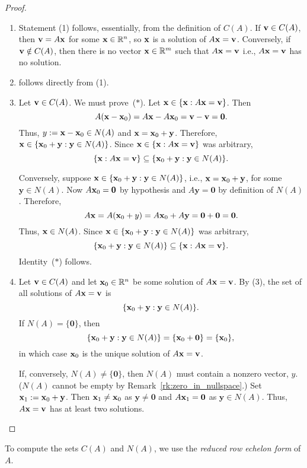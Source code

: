 \documentclass[12pt]{amsart}
\newcommand{\RR}{\mathbb{R}} \DeclareMathOperator{\rref}{rref}
\theoremstyle{definition} \newtheorem{definition}[theorem]{Definition}
\newcommand{\by}{\mathbf{y}} \newcommand{\bz}{\mathbf{z}}
\newcommand{\bzero}{\mathbf{0}}
\newcommand{\setstuff}{\setlength{\parskip}{0.5em}\setlength{\parindent}{0em}\setlength{\itemsep}{0.5em}}
\begin{document}
\begin{proof}\hfill
  \begin{enumerate}\setstuff
  \item Statement (1) follows, essentially, from the definition of $C(A)$.
    If $\mathbf{v}\in C(A)$, then $\mathbf{v}=A\mathbf{x}$ for some $\bx\in\RR^n$, so $\mathbf{x}$ is a solution of $A\mathbf{x}=\mathbf{v}$.
    Conversely, if $\mathbf{v}\notin C(A)$, then there is no vector $\bx\in\RR^m$ such that $A\mathbf{x}=\mathbf{v}$ i.e., $A\mathbf{x}=\mathbf{v}$ has no solution.

  \item follows directly from (1).

  \item Let $\mathbf{v}\in C(A)$. We must prove~($*$). Let $\mathbf{x}\in \{\mathbf{x} : A\mathbf{x}=\mathbf{v}\}$. Then
    \[
      A(\bx-\bx_0) = A\bx - A\bx_0 = \bv - \bv = \bzero.
    \]
    Thus, $y := \mathbf{x}-\mathbf{x}_0\in N(A)$ and $\bx = \bx_0 + \by$.
    Therefore, $\bx\in \{\bx_0 + \by : \by\in N(A)\}$.
    Since $\mathbf{x}\in \{\mathbf{x} : A\mathbf{x}=\mathbf{v}\}$ was arbitrary,
    \[
      \{\bx : A\bx=\bv\}\subseteq\{\bx_0 + \by : \by\in N(A)\}.
    \]

    Conversely, suppose $\bx\in \{\bx_0 + \by : \by\in N(A)\}$, i.e., $\bx = \bx_0 + \by$, for some $\by\in N(A)$.
    Now $A\bx_0=\bzero$ by hypothesis and $A\by=\bzero$ by definition of $N(A)$.
    Therefore,
    \[
      A\bx = A(\bx_0 + y) = A\bx_0 + A\by = \bzero + \bzero = \bzero.
    \]
    Thus, $\mathbf{x}\in N(A)$.
    Since $\bx\in \{\bx_0 + \by : \by\in N(A)\}$ was arbitrary,
    \[
      \{\bx_0 + \by : \by\in N(A)\}\subseteq \{\bx : A\bx=\bv\}.
    \]
    Identity~($*$) follows.

    \item Let $\mathbf{v}\in C(A)$ and let $\bx_0\in\RR^n$ be some solution of $A\mathbf{x}=\mathbf{v}$.
    By (3), the set of all solutions of $A\mathbf{x}=\mathbf{v}$ is
    \[
      \{\bx_0+\by : \by\in N(A)\}.
    \]
    If $N(A)=\{\bzero\}$, then
    \[
      \{\bx_0+\by : \by\in N(A)\} = \{\bx_0+\bzero\}=\{\bx_0\},
    \]
    in which case $\mathbf{x}_0$ is the unique solution of $A\mathbf{x}=\mathbf{v}$.

    If, conversely, $N(A)\neq \{\bzero\}$, then $N(A)$ must contain a nonzero vector, $y$. ($N(A)$ cannot be empty by Remark~\ref{rk:zero_in_nullspace}.)
    Set $\bx_1:=\bx_0 + \by$.
    Then $\mathbf{x}_1\neq \mathbf{x}_0$ as $\by\neq \bzero$ and $A\bx_1=\bzero$ as $\by\in N(A)$.
    Thus, $A\mathbf{x}=\mathbf{v}$ has at least two solutions.\qedhere
\end{enumerate}
\end{proof}

To compute the sets $C(A)$ and $N(A)$, we use the \emph{reduced row echelon form} of $A$.
\end{document}

